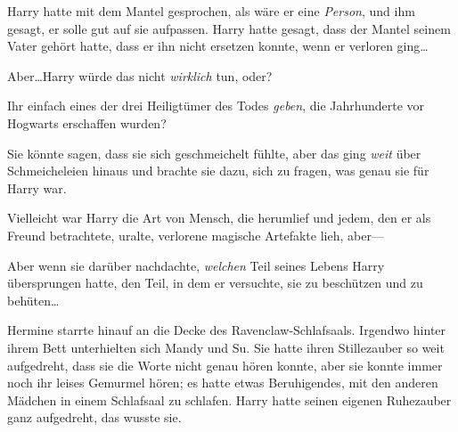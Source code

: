 Harry hatte mit dem Mantel gesprochen, als wäre er eine \emph{Person}, und ihm gesagt, er solle gut auf sie aufpassen. Harry hatte gesagt, dass der Mantel seinem Vater gehört hatte, dass er ihn nicht ersetzen konnte, wenn er verloren ging…

Aber…Harry würde das nicht \emph{wirklich} tun, oder?

Ihr einfach eines der drei Heiligtümer des Todes \emph{geben}, die Jahrhunderte vor Hogwarts erschaffen wurden?

Sie könnte sagen, dass sie sich geschmeichelt fühlte, aber das ging \emph{weit} über Schmeicheleien hinaus und brachte sie dazu, sich zu fragen, was genau sie für Harry war.

Vielleicht war Harry die Art von Mensch, die herumlief und jedem, den er als Freund betrachtete, uralte, verlorene magische Artefakte lieh, aber—

Aber wenn sie darüber nachdachte, \emph{welchen} Teil seines Lebens Harry übersprungen hatte, den Teil, in dem er versuchte, sie zu beschützen und zu behüten…

Hermine starrte hinauf an die Decke des Ravenclaw-Schlafsaals. Irgendwo hinter ihrem Bett unterhielten sich Mandy und Su. Sie hatte ihren Stillezauber so weit aufgedreht, dass sie die Worte nicht genau hören konnte, aber sie konnte immer noch ihr leises Gemurmel hören; es hatte etwas Beruhigendes, mit den anderen Mädchen in einem Schlafsaal zu schlafen. Harry hatte seinen eigenen Ruhezauber ganz aufgedreht, das wusste sie.

